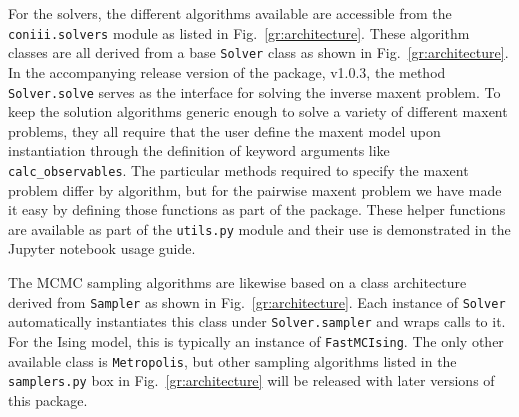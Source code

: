 \documentclass{jors}
\begin{document}
For the solvers, the different algorithms available are accessible from the {\tt coniii.solvers} module as listed in Fig.~\ref{gr:architecture}. These algorithm classes are all derived from a base {\tt Solver} class as shown in Fig.~\ref{gr:architecture}. In the accompanying release version of the package, v1.0.3, the method {\tt Solver.solve} serves as the interface for solving the inverse maxent problem. To keep the solution algorithms generic enough to solve a variety of different maxent problems, they all require that the user define the maxent model upon instantiation through the definition of keyword arguments like {\tt calc\_observables}. The particular methods required to specify the maxent problem differ by algorithm, but for the pairwise maxent problem we have made it easy by defining those functions as part of the package. These helper functions are available as part of the {\tt utils.py} module and their use is demonstrated in the Jupyter notebook usage guide.

The MCMC sampling algorithms are likewise based on a class architecture derived from {\tt Sampler} as shown in Fig.~\ref{gr:architecture}. Each instance of {\tt Solver} automatically instantiates this class under {\tt Solver.sampler} and wraps calls to it. For the Ising model, this is typically an instance of {\tt FastMCIsing}. The only other available class is {\tt Metropolis}, but other sampling algorithms listed in the {\tt samplers.py} box in Fig.~\ref{gr:architecture} will be released with later versions of this package.
\end{document}
